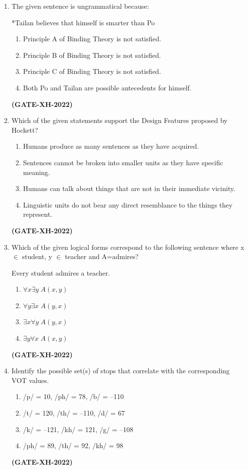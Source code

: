 \documentclass[journal]{IEEEtran}
\begin{document}
\begin{enumerate}
\item The given sentence is ungrammatical because:  

*Tailan believes that himself is smarter than Po  
\begin{enumerate}
\item Principle A of Binding Theory is not satisfied.  
\item Principle B of Binding Theory is not satisfied.  
\item Principle C of Binding Theory is not satisfied.  
\item Both Po and Tailan are possible antecedents for himself. 
\end{enumerate}
\hfill\textbf{(GATE-XH-2022)}


\item Which of the given statements support the Design Features proposed by Hockett?  
\begin{enumerate}
\item Humans produce as many sentences as they have acquired.  
\item Sentences cannot be broken into smaller units as they have specific meaning.  
\item Humans can talk about things that are not in their immediate vicinity.  
\item Linguistic units do not bear any direct resemblance to the things they represent.  
\end{enumerate}
\hfill\textbf{(GATE-XH-2022)}

\item Which of the given logical forms correspond to the following sentence where x $\in$ student, y $\in$ teacher and A=admires?  

Every student admires a teacher.  
\begin{multicols}{4}
\begin{enumerate}
\item $\forall x \exists y \; A(x,y)$  
\item $\forall y \exists x \; A(y,x)$  
\item $\exists x \forall y \; A(y,x)$  
\item $\exists y \forall x \; A(x,y)$  
\end{enumerate}
\end{multicols}
\hfill\textbf{(GATE-XH-2022)}

\item Identify the possible set(s) of stops that correlate with the corresponding VOT values.  
\begin{multicols}{2}
\begin{enumerate}
\item /p/ = 10, /ph/ = 78, /b/ = –110  
\item /t/ = 120, /th/ = –110, /d/ = 67  
\item /k/ = –121, /kh/ = 121, /g/ = –108  
\item /ph/ = 89, /th/ = 92, /kh/ = 98  
\end{enumerate}
\end{multicols}
\hfill\textbf{(GATE-XH-2022)}



\end{enumerate}
\end{document}
